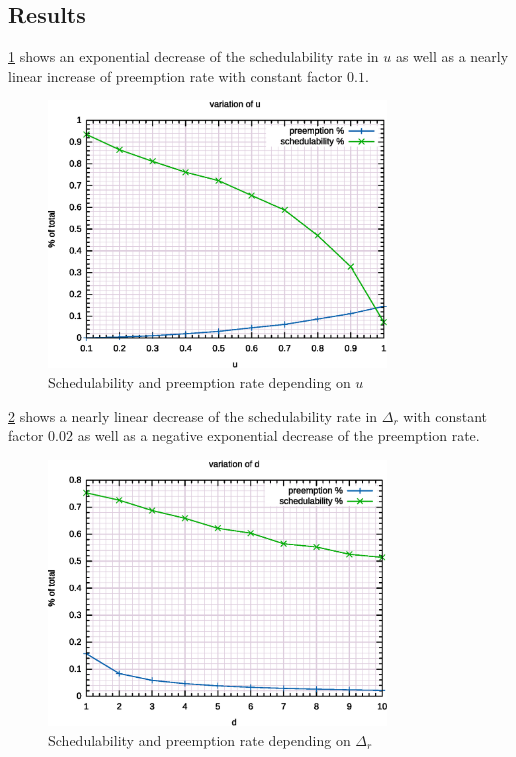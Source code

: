 \subsection{Results}



\ref{fig:stu:au} shows an exponential decrease of the schedulability rate in $u$ as well as a nearly linear increase of preemption rate with constant factor $0.1$.

\begin{figure}
	\centering
	\includegraphics[width=0.8\textwidth]{../gnuplot/eps/1}
	\caption{\label{fig:stu:au} Schedulability and preemption rate depending on $u$}
\end{figure}


\ref{fig:stu:ad} shows a nearly linear decrease of the schedulability rate in $\Delta_r$ with constant factor $0.02$ as well as a negative exponential decrease of the preemption rate.

\begin{figure}
	\centering
	\includegraphics[width=0.8\textwidth]{../gnuplot/eps/2}
	\caption{\label{fig:stu:ad} Schedulability and preemption rate depending on $\Delta_r$}
\end{figure}

